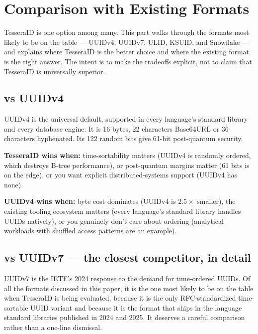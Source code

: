 \section{Comparison with Existing Formats}
\label{sec:compare}

TesseraID is one option among many. This part walks through the formats most likely to be on the table --- UUIDv4, UUIDv7, ULID, KSUID, and Snowflake --- and explains where TesseraID is the better choice and where the existing format is the right answer. The intent is to make the tradeoffs explicit, not to claim that TesseraID is universally superior.

\subsection{vs UUIDv4 \citep{rfc4122}}

UUIDv4 is the universal default, supported in every language's standard library and every database engine. It is 16 bytes, 22 characters Base64URL or 36 characters hyphenated. Its 122 random bits give 61-bit post-quantum security.

\textbf{TesseraID wins when:} time-sortability matters (UUIDv4 is randomly ordered, which destroys B-tree performance), or post-quantum margins matter (61 bits is on the edge), or you want explicit distributed-systems support (UUIDv4 has none).

\textbf{UUIDv4 wins when:} byte cost dominates (UUIDv4 is $2.5\times$ smaller), the existing tooling ecosystem matters (every language's standard library handles UUIDs natively), or you genuinely don't care about ordering (analytical workloads with shuffled access patterns are an example).

\subsection{vs UUIDv7 \citep{rfc9562} --- the closest competitor, in detail}

UUIDv7 is the IETF's 2024 response to the demand for time-ordered UUIDs. Of all the formats discussed in this paper, it is the one most likely to be on the table when TesseraID is being evaluated, because it is the only RFC-standardized time-sortable UUID variant and because it is the format that ships in the language standard libraries published in 2024 and 2025. It deserves a careful comparison rather than a one-line dismissal.

